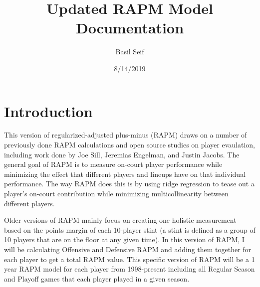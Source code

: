 \documentclass[]{article}
\title{Updated RAPM Model Documentation}
\author{Basil Seif}
\date{8/14/2019}
\begin{document}
\maketitle

\section{Introduction}

This version of regularized-adjusted plus-minus (RAPM) draws on a number
of previously done RAPM calculations and open source studies on player
evaulation, including work done by Joe Sill, Jeremias Engelman, and
Justin Jacobs. The general goal of RAPM is to measure on-court player
performance while minimizing the effect that different players and
lineups have on that individual performance. The way RAPM does this is
by using ridge regression to tease out a player's on-court contribution
while minimizing multicollinearity between different players.

Older versions of RAPM mainly focus on creating one holistic measurement
based on the points margin of each 10-player stint (a stint is defined
as a group of 10 players that are on the floor at any given time). In
this version of RAPM, I will be calculating Offensive and Defensive RAPM
and adding them together for each player to get a total RAPM value. This
specific version of RAPM will be a 1 year RAPM model for each player
from 1998-present including all Regular Season and Playoff games that
each player played in a given season.
\end{document}
